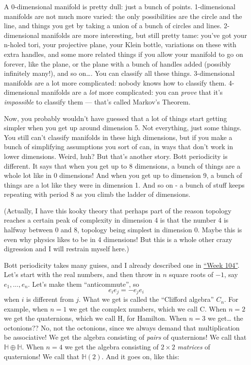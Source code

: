 \documentclass{article}
\begin{document}
A 0-dimensional manifold is pretty dull: just a bunch of points.
1-dimensional manifolds are not much more varied: the only possibilities
are the circle and the line, and things you get by taking a union of a
bunch of circles and lines. 2-dimensional manifolds are more
interesting, but still pretty tame: you've got your n-holed tori, your
projective plane, your Klein bottle, variations on these with extra
handles, and some more related things if you allow your manifold to go
on forever, like the plane, or the plane with a bunch of handles added
(possibly infinitely many!), and so on\ldots. You can classify all these
things. 3-dimensional manifolds are a lot more complicated: nobody knows
how to classify them. 4-dimensional manifolds are a \emph{lot} more
complicated: you can \emph{prove} that it's \emph{impossible} to
classify them --- that's called Markov's Theorem.

Now, you probably wouldn't have guessed that a lot of things start
getting simpler when you get up around dimension 5. Not everything, just
some things. You still can't classify manifolds in these high
dimensions, but if you make a bunch of simplifying assumptions you sort
of can, in ways that don't work in lower dimensions. Weird, huh? But
that's another story. Bott periodicity is different. It says that when
you get up to 8 dimensions, a bunch of things are a whole lot like in 0
dimensions! And when you get up to dimension 9, a bunch of things are a
lot like they were in dimension 1. And so on - a bunch of stuff keeps
repeating with period 8 as you climb the ladder of dimensions.

(Actually, I have this kooky theory that perhaps part of the reason
topology reaches a certain peak of complexity in dimension 4 is that the
number 4 is halfway between 0 and 8, topology being simplest in
dimension 0. Maybe this is even why physics likes to be in 4 dimensions!
But this is a whole other crazy digression and I will restrain myself
here.)

Bott periodicity takes many guises, and I already described one in
\protect\hyperlink{week104}{``Week 104''}. Let's start with the real
numbers, and then throw in \(n\) square roots of \(-1\), say
\(e_1,\ldots,e_n\). Let's make them ``anticommute'', so
\[e_i e_j = - e_j e_i\] when \(i\) is different from \(j\). What we get
is called the ``Clifford algebra'' \(C_n\). For example, when \(n = 1\)
we get the complex numbers, which we call C. When \(n = 2\) we get the
quaternions, which we call H, for Hamilton. When \(n = 3\) we
get\ldots{} the octonions?? No, not the octonions, since we always
demand that multiplication be associative! We get the algebra consisting
of \emph{pairs} of quaternions! We call that
\(\mathbb{H}\oplus\mathbb{H}\). When \(n = 4\) we get the algebra
consisting of \(2\times2\) \emph{matrices} of quaternions! We call that
\(\mathbb{H}(2)\). And it goes on, like this:
\end{document}
